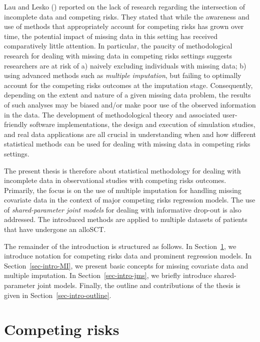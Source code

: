 \documentclass[
  letterpaper,
  DIV=11,
  numbers=noendperiod]{scrreprt}
\begin{document}
Lau and Lesko ()
reported on the lack of research regarding the intersection of
incomplete data and competing risks. They stated that while the
awareness and use of methods that appropriately account for competing
risks has grown over time, the potential impact of missing data in this
setting has received comparatively little attention. In particular, the
paucity of methodological research for dealing with missing data in
competing risks settings suggests researchers are at risk of a) naively
excluding individuals with missing data; b) using advanced methods such
as \emph{multiple imputation}, but failing to optimally account for the
competing risks outcomes at the imputation stage. Consequently,
depending on the extent and nature of a given missing data problem, the
results of such analyses may be biased and/or make poor use of the
observed information in the data. The development of methodological
theory and associated user-friendly software implementations, the design
and execution of simulation studies, and real data applications are all
crucial in understanding when and how different statistical methods can
be used for dealing with missing data in competing risks settings.

The present thesis is therefore about statistical methodology for
dealing with incomplete data in observational studies with competing
risks outcomes. Primarily, the focus is on the use of multiple
imputation for handling missing covariate data in the context of major
competing risks regression models. The use of \emph{shared-parameter
joint models} for dealing with informative drop-out is also addressed.
The introduced methods are applied to multiple datasets of patients that
have undergone an alloSCT.

The remainder of the introduction is structured as follows. In
Section~\ref{sec-intro-comp-risks}, we introduce notation for competing
risks data and prominent regression models. In
Section~\ref{sec-intro-MI}, we present basic concepts for missing
covariate data and multiple imputation. In Section~\ref{sec-intro-jms},
we briefly introduce shared-parameter joint models. Finally, the outline
and contributions of the thesis is given in
Section~\ref{sec-intro-outline}.

\section{Competing risks}\label{sec-intro-comp-risks}
\end{document}
